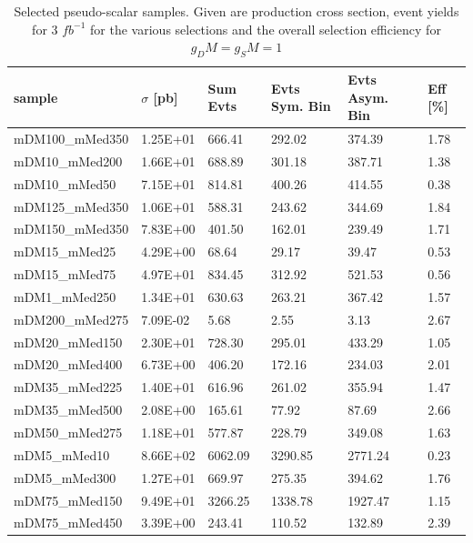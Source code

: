 \begin{table}[h]
\centering
\begin{tabular}{llllll}
\hline
sample             & $\sigma$ [pb] & Sum Evts       & Evts Sym. Bin & Evts Asym. Bin & Eff  [\%]   \\\hline
mDM100\_mMed350 & 1.25E+01 & 666.41   & 292.02   & 374.39   & 1.78 \\
mDM10\_mMed200  & 1.66E+01 & 688.89   & 301.18   & 387.71   & 1.38 \\
mDM10\_mMed50   & 7.15E+01 & 814.81   & 400.26   & 414.55   & 0.38 \\
mDM125\_mMed350 & 1.06E+01 & 588.31   & 243.62   & 344.69   & 1.84 \\
mDM150\_mMed350 & 7.83E+00 & 401.50   & 162.01   & 239.49   & 1.71 \\
mDM15\_mMed25   & 4.29E+00 & 68.64    & 29.17    & 39.47    & 0.53 \\
mDM15\_mMed75   & 4.97E+01 & 834.45   & 312.92   & 521.53   & 0.56 \\
mDM1\_mMed250   & 1.34E+01 & 630.63   & 263.21   & 367.42   & 1.57 \\
mDM200\_mMed275 & 7.09E-02 & 5.68     & 2.55     & 3.13     & 2.67 \\
mDM20\_mMed150  & 2.30E+01 & 728.30   & 295.01   & 433.29   & 1.05 \\
mDM20\_mMed400  & 6.73E+00 & 406.20   & 172.16   & 234.03   & 2.01 \\
mDM35\_mMed225  & 1.40E+01 & 616.96   & 261.02   & 355.94   & 1.47 \\
mDM35\_mMed500  & 2.08E+00 & 165.61   & 77.92    & 87.69    & 2.66 \\
mDM50\_mMed275  & 1.18E+01 & 577.87   & 228.79   & 349.08   & 1.63 \\
mDM5\_mMed10    & 8.66E+02 & 6062.09 & 3290.85 & 2771.24 & 0.23 \\
mDM5\_mMed300   & 1.27E+01 & 669.97   & 275.35   & 394.62   & 1.76 \\
mDM75\_mMed150  & 9.49E+01 & 3266.25 & 1338.78 & 1927.47 & 1.15 \\
mDM75\_mMed450  & 3.39E+00 & 243.41   & 110.52   & 132.89   & 2.39\\
\hline
\end{tabular}
\caption{Selected pseudo-scalar samples. Given are production cross section, event yields for 3 $fb^{-1 }$ for the various selections and the overall selection efficiency for $g_DM=g_SM=1$}
\label{tab:dm_P_g1_3fb}
\end{table}


